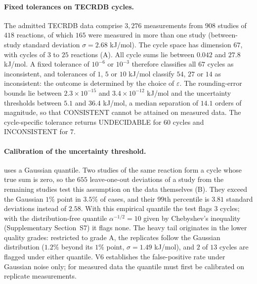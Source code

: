 \documentclass[11pt,a4paper]{article}
\theoremstyle{pstyle}
\theoremstyle{definition}
\theoremstyle{remark}
\newcommand{\eps}{\varepsilon}
\begin{document}
\paragraph{Fixed tolerances on TECRDB cycles.} The admitted TECRDB data
comprise $3{,}276$ measurements from $908$ studies of $418$ reactions,
of which $165$ were measured in more than one study (between-study
standard deviation $\sigma=2.68$ kJ/mol). The cycle space has dimension
$67$, with cycles of $3$ to $25$ reactions (A).
All cycle sums lie between $0.042$ and $27.8$ kJ/mol. A fixed
tolerance of $10^{-6}$ or $10^{-3}$ therefore classifies all $67$ cycles
as inconsistent, and tolerances of $1$, $5$ or $10$ kJ/mol classify
$54$, $27$ or $14$ as inconsistent: the outcome is determined by the
choice of $\eps$. The rounding-error bounds lie between
$2.3\times10^{-15}$ and $3.4\times10^{-12}$ kJ/mol and the uncertainty
thresholds between $5.1$ and $36.4$ kJ/mol, a median separation of
$14.1$ orders of magnitude, so that \textsf{CONSISTENT} cannot be
attained on measured data. The cycle-specific tolerance returns
\textsf{UNDECIDABLE} for $60$ cycles and \textsf{INCONSISTENT} for $7$.

\paragraph{Calibration of the uncertainty threshold.}
 uses a Gaussian quantile. Two studies of the same
reaction form a cycle whose true sum is zero, so the $655$ leave-one-out
deviations of a study from the remaining studies test this assumption
on the data themselves (B). They exceed the
Gaussian $1\%$ point in $3.5\%$ of cases, and their $99$th percentile is
$3.81$ standard deviations instead of $2.58$. With this empirical
quantile the test flags $3$ cycles; with the distribution-free quantile
$\alpha^{-1/2}=10$ given by Chebyshev's inequality (Supplementary
Section~S7) it flags none. The heavy tail originates in the lower
quality grades: restricted to grade A, the replicates follow the
Gaussian distribution ($1.2\%$ beyond its $1\%$ point, $\sigma=1.49$
kJ/mol), and $2$ of $13$ cycles are flagged under either quantile. V6
establishes the false-positive rate under Gaussian noise only; for
measured data the quantile must first be calibrated on replicate
measurements.
\end{document}
